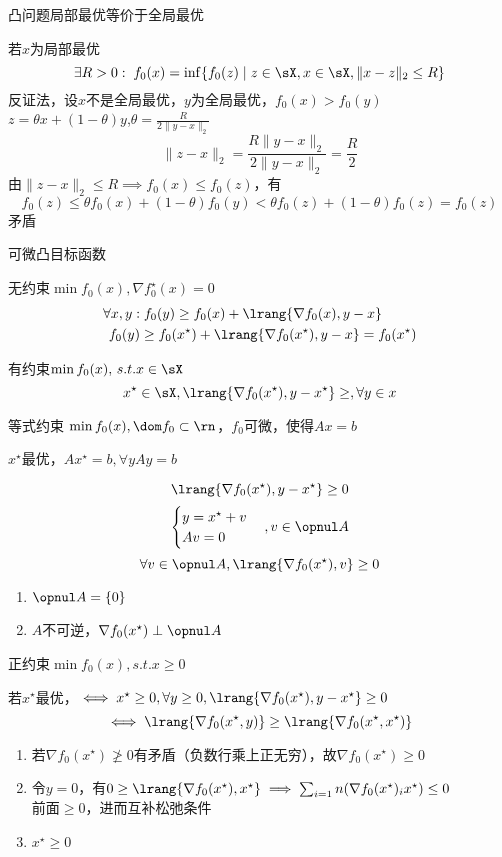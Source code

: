 \begin{theorem}
凸问题局部最优等价于全局最优
\end{theorem}
\begin{analysis}
若$x$为局部最优
\[\exists R>0:\;f_0(x)=\inf\{f_0(z)\mid z\in\sX,x\in\sX,\|x-z\|_2\leq R\}\]
反证法，设$x$不是全局最优，$y$为全局最优，$f_0(x)>f_0(y)$\\
$z=\theta x+(1-\theta)y$,$\theta=\frac{R}{2\|y-x\|_2}$
\[\|z-x\|_2=\frac{R\|y-x\|_2}{2\|y-x\|_2}=\frac{R}{2}\]
由$\|z-x\|_2\leq R\implies f_0(x)\leq f_0(z)$，有
\[f_0(z)\leq\theta f_0(x)+(1-\theta)f_0(y)<\theta f_0(z)+(1-\theta)f_0(z)=f_0(z)\]
矛盾
\end{analysis}

可微凸目标函数

无约束$\min f_0(x),\nabla f_0^\star(x)=0$
\[\begin{aligned}
\forall x,y:&\;f_0(y)\geq f_0(x)+\lrang{\nabla f_0(x),y-x}\\
f_0(y)&\geq f_0(x^\star)+\lrang{\nabla f_0(x^\star),y-x}=f_0(x^\star)
\end{aligned}\]

有约束$\min f_0(x),\,s.t. x\in\sX$
\[x^\star\in\sX,\lrang{\nabla f_0(x^\star),y-x^\star}\geq,\forall y\in x\]

\begin{example}
等式约束 $\min f_0(x),\dom f_0\subset\rn$，$f_0$可微，使得$Ax=b$
\end{example}
\begin{analysis}
$x^\star$最优，$Ax^\star=b,\forall y Ay=b$

\[\lrang{\nabla f_0(x^\star),y-x^\star}\geq 0\]
\[\begin{cases} y=x^\star+v\\Av=0\end{cases},v\in\opnul A\]
\[\forall v\in\opnul A,\lrang{\nabla f_0(x^\star),v}\geq 0\]
\begin{enumerate}
	\item $\opnul A=\{0\}$
	\item $A$不可逆，$\nabla f_0(x^\star)\perp\opnul A$
\end{enumerate}
\end{analysis}

\begin{example}
正约束$\min f_0(x),s.t. x\geq 0$
\end{example}
\begin{analysis}
若$x^\star$最优，$\iff x^\star\geq 0,\forall y\geq 0,\lrang{\nabla f_0(x^\star),y-x^\star}\geq 0$
\[\iff \lrang{\nabla f_0(x^\star,y)}\geq\lrang{\nabla f_0(x^\star,x^\star)}\]
\begin{enumerate}
\item 若$\nabla f_0(x^\star)\ngeq 0$有矛盾（负数行乘上正无穷），故$\nabla f_0(x^\star)\geq 0$
\item 令$y=0$，有$0\geq \lrang{\nabla f_0(x^\star),x^\star}\implies\sum_{i=1}n(\nabla f_0(x^\star)_ix^\star)\leq 0$\\
前面$\geq 0$，进而互补松弛条件
\item $x^\star\geq 0$
\end{enumerate}
\end{analysis}

